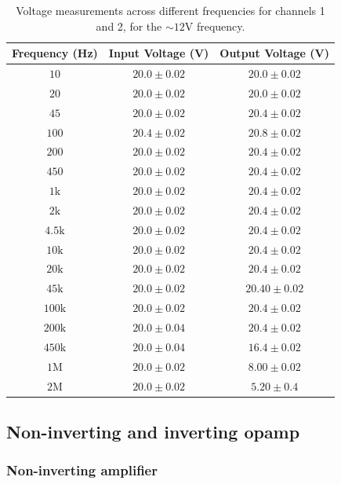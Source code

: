 \documentclass[11pt]{article}
\begin{document}
\begin{table}[H]
	\centering
	\begin{tabular}{|c|c|c|}
	\hline
	Frequency (Hz) & Input Voltage (V) & Output Voltage (V) \\
	\hline
	$10$ & $20.0 \pm 0.02$ & $20.0 \pm 0.02$ \\
	$20$ & $20.0 \pm 0.02$ & $20.0 \pm 0.02$ \\
	$45$ & $20.0 \pm 0.02$ & $20.4 \pm 0.02$ \\
	$100$ & $20.4 \pm 0.02$ & $20.8 \pm 0.02$ \\
	$200$ & $20.0 \pm 0.02$ & $20.4 \pm 0.02$ \\
	$450$ & $20.0 \pm 0.02$ & $20.4 \pm 0.02$ \\
	$1\text{k}$ & $20.0 \pm 0.02$ & $20.4 \pm 0.02$ \\
	$2\text{k}$ & $20.0 \pm 0.02$ & $20.4 \pm 0.02$ \\
	$4.5\text{k}$ & $20.0 \pm 0.02$ & $20.4 \pm 0.02$ \\
	$10\text{k}$ & $20.0 \pm 0.02$ & $20.4 \pm 0.02$ \\
	$20\text{k}$ & $20.0 \pm 0.02$ & $20.4 \pm 0.02$ \\
	$45\text{k}$ & $20.0 \pm 0.02$ & $20.40 \pm 0.02$ \\
	$100\text{k}$ & $20.0 \pm 0.02$ & $20.4 \pm 0.02$ \\
	$200\text{k}$ & $20.0 \pm 0.04$ & $20.4 \pm 0.02$ \\
	$450\text{k}$ & $20.0 \pm 0.04$ & $16.4 \pm 0.02$ \\
	$1\text{M}$ & $20.0 \pm 0.02$ & $8.00 \pm 0.02$ \\
	$2\text{M}$ & $20.0 \pm 0.02$ & $5.20 \pm 0.4$ \\
	\hline
	\end{tabular}
	\caption{Voltage measurements across different frequencies for channels 1 and 2,
	for the $\sim 12\si{\volt}$ frequency.}
	\label{tab:voltage_measurements_chung}
\end{table}

\subsection{Non-inverting and inverting opamp}


\subsubsection{Non-inverting amplifier}
\end{document}
